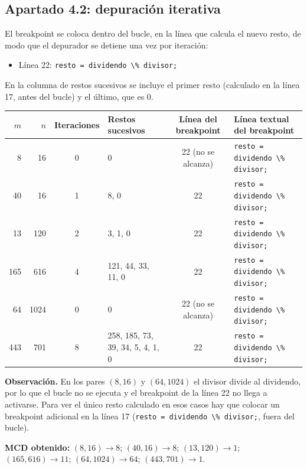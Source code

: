 \documentclass[11pt,a4paper]{article}
\newcommand{\cod}[1]{\lstinline[basicstyle=\ttfamily\footnotesize]|#1|}
\begin{document}
\subsection{Apartado 4.2: depuración iterativa}
El breakpoint se coloca dentro del bucle, en la línea que calcula el nuevo resto, de modo que el depurador se detiene una vez por iteración:
\begin{itemize}
  \item Línea 22: \cod{resto = dividendo \% divisor;}
\end{itemize}
En la columna de restos sucesivos se incluye el primer resto (calculado en la línea 17, antes del bucle) y el último, que es 0.

\begin{center}
\footnotesize
\begin{tabular}{rr c p{4.1cm} c p{3.8cm}}
\toprule
$m$ & $n$ & Iteraciones & Restos sucesivos & Línea del breakpoint & Línea textual del breakpoint \\
\midrule
8   & 16   & 0 & 0 & 22 (no se alcanza) & \cod{resto = dividendo \% divisor;} \\
40  & 16   & 1 & 8, 0 & 22 & \cod{resto = dividendo \% divisor;} \\
13  & 120  & 2 & 3, 1, 0 & 22 & \cod{resto = dividendo \% divisor;} \\
165 & 616  & 4 & 121, 44, 33, 11, 0 & 22 & \cod{resto = dividendo \% divisor;} \\
64  & 1024 & 0 & 0 & 22 (no se alcanza) & \cod{resto = dividendo \% divisor;} \\
443 & 701  & 8 & 258, 185, 73, 39, 34, 5, 4, 1, 0 & 22 & \cod{resto = dividendo \% divisor;} \\
\bottomrule
\end{tabular}
\end{center}

\noindent\textbf{Observación.} En los pares $(8,16)$ y $(64,1024)$ el divisor divide al dividendo, por lo que el bucle no se ejecuta y el breakpoint de la línea 22 no llega a activarse. Para ver el único resto calculado en esos casos hay que colocar un breakpoint adicional en la línea 17 (\cod{resto = dividendo \% divisor;}, fuera del bucle).

\bigskip
\noindent\textbf{MCD obtenido:} $(8,16)\to 8$; $(40,16)\to 8$; $(13,120)\to 1$; $(165,616)\to 11$; $(64,1024)\to 64$; $(443,701)\to 1$.
\end{document}
